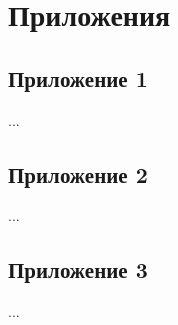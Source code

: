 \documentclass[../thesis.tex]{subfiles}
\begin{document}
\section*{Приложения}



\subsection*{Приложение 1}

...

\newpage



\subsection*{Приложение 2}

...

\newpage



\subsection*{Приложение 3}

...
\end{document}

